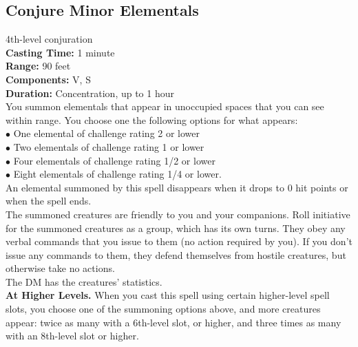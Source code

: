 \documentclass[11pt, A4paper, english]{article}
\begin{document}
		\subsection{Conjure Minor Elementals}
4th-level conjuration \\
\textbf{Casting Time:} 1 minute \\
\textbf{Range:} 90 feet \\
\textbf{Components:} V, S \\
\textbf{Duration:} Concentration, up to 1 hour \\
You summon elementals that appear in unoccupied spaces that you can see within range. You choose one the following options for what appears: \\
$\bullet$ One elemental of challenge rating 2 or lower \\
$\bullet$ Two elementals of challenge rating 1 or lower \\
$\bullet$ Four elementals of challenge rating 1/2 or lower \\
$\bullet$ Eight elementals of challenge rating 1/4 or lower. \\
An elemental summoned by this spell disappears when it drops to 0 hit points or when the spell ends. \\
The summoned creatures are friendly to you and your companions. Roll initiative for the summoned creatures as a group, which has its own turns. They obey any verbal commands that you issue to them (no action required by you). If you don’t issue any commands to them, they defend themselves from hostile creatures, but otherwise take no actions. \\
The DM has the creatures' statistics. \\
\textbf{At Higher Levels.} When you cast this spell using certain higher-level spell slots, you choose one of the summoning options above, and more creatures appear: twice as many with a 6th-level slot, or higher, and three times as many with an 8th-level slot or higher.
\end{document}
